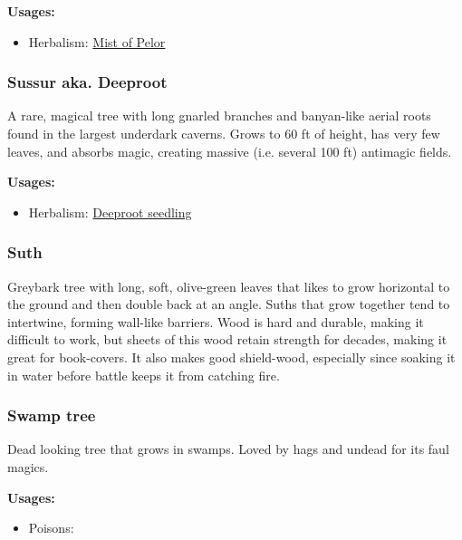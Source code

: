 \textbf{Usages:}

\begin{itemize}[noitemsep]
\item[] Herbalism: \hyperref[Mist of Pelor]{Mist of Pelor}
\end{itemize}

\subsubsection{Sussur aka. Deeproot}
\label{Sussur}

A rare, magical tree with long gnarled branches and banyan-like aerial roots found in the largest underdark caverns. Grows to 60 ft of height, has very few leaves, and absorbs magic, creating massive (i.e. several 100 ft) antimagic fields.

\vspace{5mm}

\textbf{Usages:}

\begin{itemize}[noitemsep]
\item[] Herbalism: \hyperref[Deeproot seedling]{Deeproot seedling}
\end{itemize}

\subsubsection{Suth}

Greybark tree with long, soft, olive-green leaves that likes to grow horizontal to the ground and then double back at an angle. Suths that grow together tend to intertwine, forming wall-like barriers. Wood is hard and durable, making it difficult to work, but sheets of this wood retain strength for decades, making it great for book-covers. It also makes good shield-wood, especially since soaking it in water before battle keeps it from catching fire.

\subsubsection{Swamp tree}
\label{Swamp tree}

Dead looking tree that grows in swamps. Loved by hags and undead for its faul magics.

\vspace{5mm}

\textbf{Usages:}

\begin{itemize}[noitemsep]
\item[] Poisons: \poison
\end{itemize}


